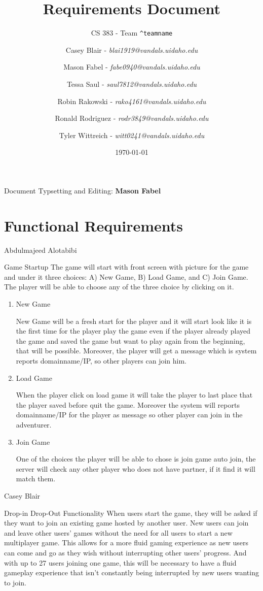\documentclass[12pt]{report}
\title{Requirements Document}
\subtitle{CS 383 - Team \texttt{\textasciicircum teamname}}
\author{
     Casey Blair - \textit{blai1919@vandals.uidaho.edu} \\
\and Mason Fabel - \textit{fabe0940@vandals.uidaho.edu} \\
\and Tessa Saul - \textit{saul7812@vandals.uidaho.edu} \\
\and Robin Rakowski - \textit{rako4161@vandals.uidaho.edu} \\
\and Ronald Rodriguez - \textit{rodr3849@vandals.uidaho.edu} \\
\and Tyler Wittreich - \textit{witt0241@vandals.uidaho.edu} \\
}
\date{\today}
\begin{document}
\maketitle

\tableofcontents
Document Typsetting and Editing: \textbf{Mason Fabel}
\clearpage

\chapter{Functional Requirements}

\begin{section}{Abdulmajeed Alotabibi}
\begin{subsection}{Game Startup}
The game will start with front screen with picture for the game and under
it three choices: A) New Game, B) Load Game, and C) Join Game. The player
will be able to choose any of the three choice by clicking on it.

\begin{enumerate}
\item New Game

New Game will be a fresh start for the player and it will start look like
it is the first time for the player play the game even if the player
already played the game and saved the game but want to play again from the
beginning, that will be possible. Moreover, the player will get a message
which is system reports domainname/IP, so other players can join him.

\item Load Game

When the player click on load game it will take the player to last place
that the player saved before quit the game. Moreover the system will
reports domainname/IP for the player as message so other player can join in
the adventurer.

\item Join Game

One of the choices the player will be able to chose is join game auto join,
the server will check any other player who does not have partner, if it
find it will match them.
\end{enumerate}
\end{subsection}
\end{section}

\begin{section}{Casey Blair}
\begin{subsection}{Drop-in Drop-Out Functionality}
When users start the game, they will be asked if they want to join an
existing game hosted by another user. New users can join and leave other
users’ games without the need for all users to start a new multiplayer game. This allows
for a more fluid gaming experience as new users can come and go as they
wish without interrupting other users’ progress. And with up to 27 users
joining one game, this will be necessary to have a fluid gameplay
experience that isn’t constantly being interrupted by new users wanting to
join.
\end{subsection}
\end{section}
\end{document}
